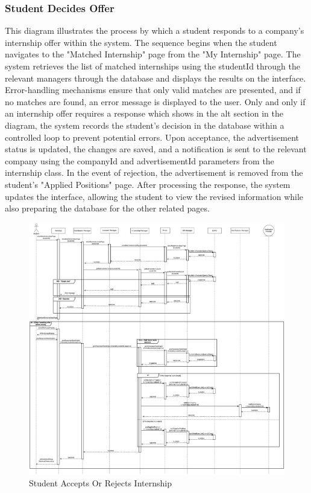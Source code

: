 \documentclass[a4paper,12pt]{article}
\begin{document}
    \subsubsection*{ Student Decides Offer}
    This diagram illustrates the process by which a student responds to a company’s internship offer within the system. The sequence begins when the student navigates to the "Matched Internship" page from the "My Internship" page. The system retrieves the list of matched internships using the studentId through the relevant managers through the database and displays the results on the interface. Error-handling mechanisms ensure that only valid matches are presented, and if no matches are found, an error message is displayed to the user.
    Only and only if an internship offer requires a response which shows in the alt section in the diagram, the system records the student’s decision in the database within a controlled loop to prevent potential errors. Upon acceptance, the advertisement status is updated, the changes are saved, and a notification is sent to the relevant company using the companyId and advertisementId parameters from the internship class. In the event of rejection, the advertisement is removed from the student's "Applied Positions" page. After processing the response, the system updates the interface, allowing the student to view the revised information while also preparing the database for the other related pages.
    \begin{figure}[H]
    \centering
    \includegraphics[scale = 0.25]{DD_figures/RuntimeView/studentConfirmCompany.drawio.png}
    \caption{Student Accepts Or Rejects Internship}
\end{figure}
\end{document}
